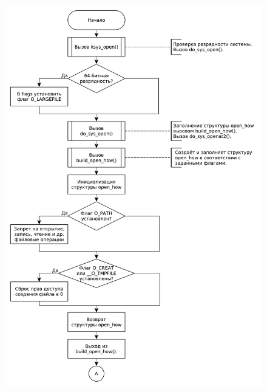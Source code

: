 \documentclass[a4paper,oneside,12pt]{extreport}
\begin{document}


\begin{figure}[H]
	\centering
	\includegraphics[scale=0.70]{inc/img/open1}
\end{figure}
\end{document}
